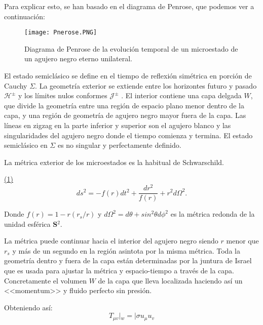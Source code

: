 \documentclass[letterpaper]{article}
\begin{document}
\begin{justify}
Para explicar esto, se han basado en el diagrama de Penrose, que podemos ver a continuación:
\vspace{\baselineskip}

\begin{figure}[h]
    \centering
    \texttt{[image: Pnerose.PNG]}
    \caption{Diagrama de Penrose de la evolución temporal de un microestado de un agujero negro eterno unilateral.}   
\end{figure}
\end{justify}
\begin{justify}
El estado semiclásico se define en el tiempo de reflexión simétrica en porción de Cauchy \(\Sigma\).
La geometría exterior se extiende entre los horizontes futuro y pasado \(\mathscr{H}^\pm \)
y los límites nulos conformes \(\mathscr{J}^\pm\) . El interior contiene una capa delgada \(W\), que divide la geometría entre una región de espacio plano menor dentro de la capa, y una región de geometría de agujero negro mayor fuera de la capa.
Las líneas en zigzag en la parte inferior y superior son el agujero blanco y las singularidades del agujero negro donde el tiempo comienza y termina. El estado semiclásico en \(\Sigma\) es no singular y perfectamente definido.
\end{justify}
\begin{justify}
La métrica exterior de los microestados es la habitual de Schwarschild.

\underline{(1)}
\[ds^2=-f\left(r\right)dt^2+\frac{dr^2}{f\left(r\right)}+r^2d\Omega^2.  \]
\end{justify}
\begin{justify}
Donde \(f\left(r\right)=1-r\left(r_s/r\right)\) y \(d\Omega^2=d\theta+sin^2\theta d\phi^2\) es la métrica redonda de la unidad esférica \textbf{S}\(^2\). 
\end{justify}
\begin{justify}
La métrica puede continuar hacia el interior del agujero negro siendo \(r\) menor que \(r_s\) y más de un segundo en la región asintota por la misma métrica.
Toda la geometría dentro y fuera de la capa están determinadas por la juntura de Israel que es usada para ajustar la métrica y espacio-tiempo a través de la capa.
Concretamente el volumen \(W\) de la capa que lleva localizada haciendo así un <<momentum>> y fluido perfecto sin presión.
\end{justify}
\begin{justify}
Obteniendo así: \[T_{\mu v}|_w =|\sigma u_\mu u_v \]
\end{justify}
\end{document}
